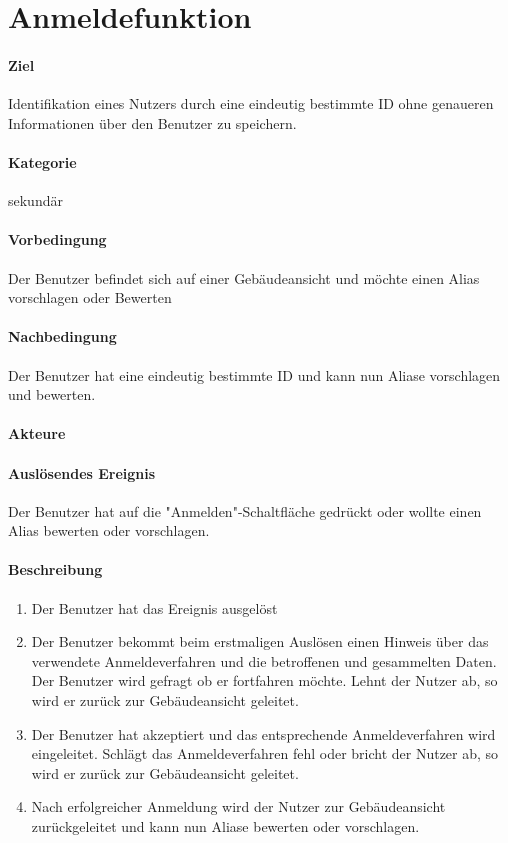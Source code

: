 \section{Anmeldefunktion}
\label{Anmeldefunktion}
\paragraph{Ziel}
Identifikation eines Nutzers durch eine eindeutig bestimmte ID ohne genaueren Informationen über den Benutzer zu speichern.
\paragraph{Kategorie}
sekundär
\paragraph{Vorbedingung}
Der Benutzer befindet sich auf einer Gebäudeansicht und möchte einen Alias vorschlagen oder Bewerten
\paragraph{Nachbedingung}
Der Benutzer hat eine eindeutig bestimmte ID und kann nun Aliase vorschlagen und bewerten.
\paragraph{Akteure}

\paragraph{Auslösendes Ereignis}
Der Benutzer hat auf die "Anmelden"-Schaltfläche gedrückt oder wollte einen Alias bewerten oder vorschlagen.
\paragraph{Beschreibung}
\begin{enumerate}
    \item Der Benutzer hat das Ereignis ausgelöst
    \item Der Benutzer bekommt beim erstmaligen Auslösen einen Hinweis über das verwendete Anmeldeverfahren und die betroffenen und gesammelten Daten.
          Der Benutzer wird gefragt ob er fortfahren möchte.
          \subtitem Lehnt der Nutzer ab, so wird er zurück zur Gebäudeansicht geleitet.
    \item Der Benutzer hat akzeptiert und das entsprechende Anmeldeverfahren wird eingeleitet.
          \subitem Schlägt das Anmeldeverfahren fehl oder bricht der Nutzer ab, so wird er zurück zur Gebäudeansicht geleitet.
    \item Nach erfolgreicher Anmeldung wird der Nutzer zur Gebäudeansicht zurückgeleitet und kann nun Aliase bewerten oder vorschlagen.
\end{enumerate}